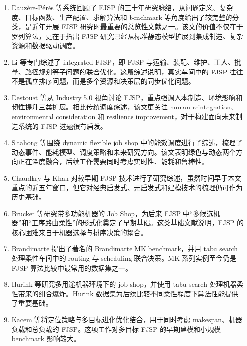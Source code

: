 \documentclass[UTF8,a4paper,11pt]{ctexart}
\begin{document}
\begin{enumerate}[label=\textbf{F\arabic*.},leftmargin=3em]
\item Dauz\`ere-P\'er\`es 等系统回顾了 FJSP 的三十年研究脉络，从问题定义、复杂度、目标函数、生产配置、求解算法和 benchmark 等角度给出了较完整的分类，是近年开展 FJSP 研究时最重要的总览性文献之一\cite{Dauzere-Peres2024}。该文的价值不仅在于罗列算法，更在于指出 FJSP 研究已经从标准静态模型扩展到集成制造、复杂资源和数据驱动调度。

\item Li 等专门综述了 integrated FJSP，即 FJSP 与运输、装配、维护、工人、批量、路径规划等子问题的联合优化\cite{Li2022SurveyIntegrated}。这篇综述说明，真实车间中的 FJSP 往往不是孤立排序问题，而是多个资源和决策层的同步优化问题。

\item Destouet 等从 Industry 5.0 视角讨论 FJSP，重点强调人本制造、环境影响和韧性提升三类扩展\cite{Destouet2023Industry5}。相比传统调度综述，该文更关注 human reintegration、environmental consideration 和 resilience improvement，对于构建面向未来制造系统的 FJSP 选题很有启发。

\item Sitahong 等围绕 dynamic flexible job shop 中的能效调度进行了综述，梳理了动态事件、能耗模型、调度策略和未来研究方向\cite{Sitahong2025Review}。该文表明绿色与动态两个方向正在深度融合，后续工作需要同时考虑实时性、能耗和鲁棒性。

\item Chaudhry 与 Khan 对较早期 FJSP 技术进行了研究综述，虽然时间早于本文重点的近五年窗口，但它对经典启发式、元启发式和建模技术的梳理仍可作为历史基础\cite{Chaudhry2016Survey}。

\item Brucker 等研究带多功能机器的 Job Shop，为后来 FJSP 中“多候选机器”和“工序路由柔性”的形式化奠定了早期基础\cite{Brucker1990}。这类基础文献说明，FJSP 的核心困难来自于机器选择与排序决策的耦合。

\item Brandimarte 提出了著名的 Brandimarte MK benchmark，并用 tabu search 处理柔性车间中的 routing 与 scheduling 联合决策\cite{Brandimarte1993}。MK 系列实例至今仍是 FJSP 算法比较中最常用的数据集之一。

\item Hurink 等研究多用途机器环境下的 job-shop，并使用 tabu search 处理机器柔性带来的组合爆炸\cite{Hurink1994}。Hurink 数据集为后续比较不同柔性程度下算法性能提供了重要基础。

\item Kacem 等将定位策略与多目标进化优化结合，用于同时考虑 makespan、机器负载和总负载的 FJSP\cite{Kacem2002}。这项工作对多目标 FJSP 的早期建模和小规模 benchmark 影响较大。


\end{enumerate}
\end{document}
